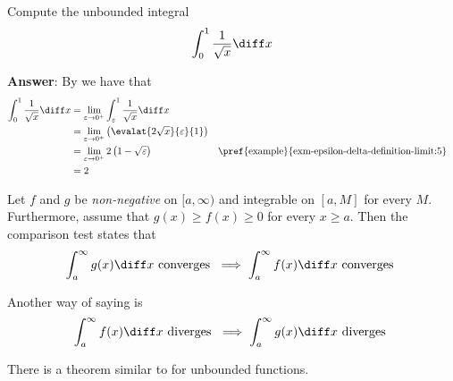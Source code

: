 \begin{exm}\label{exm-integral-of-unbounded-functions:2}
	Compute the unbounded integral
	\begin{equation*}
		\int_0^1 \frac{1}{\sqrt{x}} \diff x
	\end{equation*}
	\begin{flushleft}
		\textbf{Answer}: By  we have that
		\begin{align*}
			\int_0^1 \frac{1}{\sqrt{x}} \diff x
			 & = \lim_{\varepsilon\to0^+} \int_\varepsilon^1 \frac{1}{\sqrt{x}} \diff x                                                                    \\
			 & = \lim_{\varepsilon\to0^+} \left(\evalat{2\sqrt{x}}{\varepsilon}{1}\right)                                                                  \\
			 & = \lim_{\varepsilon\to0^+} 2\left(1-\sqrt{\varepsilon}\right)              &  & \text{\pref{example}{exm-epsilon-delta-definition-limit:5}} \\
			 & = 2
		\end{align*}
	\end{flushleft}
\end{exm}

\begin{thm}\label{thm-comparison-test}
	Let $f$ and $g$ be \textit{non-negative} on $[a,\infty)$ and integrable on
	$[a,M]$ for every $M$. Furthermore, assume that $g(x) \geq f(x) \geq 0$ for
	every $x \geq a$. Then the comparison test states that
	\begin{equation}
		\int_a^\infty g(x) \diff x \text{ converges } \implies \int_a^\infty f(x) \diff x \text{ converges }
	\end{equation}
\end{thm}

\begin{rem}\label{rem-comparison-test:1}
	Another way of saying  is
	\begin{equation}
		\int_a^\infty f(x) \diff x \text{ diverges } \implies \int_a^\infty g(x) \diff x \text{ diverges }
	\end{equation}
\end{rem}

\begin{rem}\label{rem-comparison-test:3}
	There is a theorem similar to  for unbounded functions.
\end{rem}

